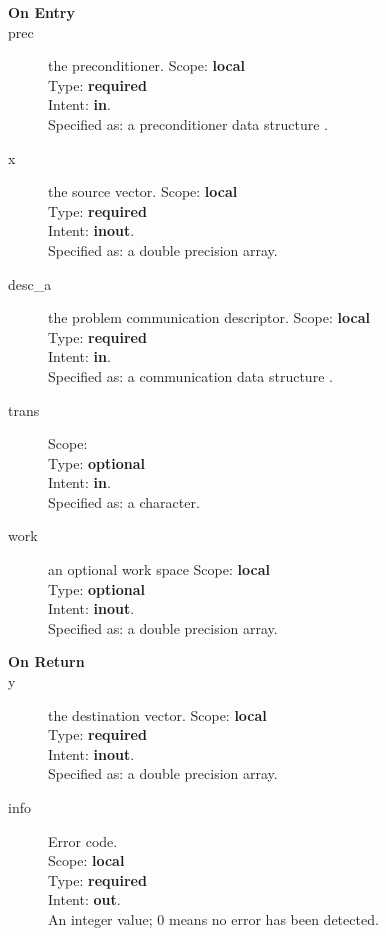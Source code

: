 

\begin{description}
\item[\bf On Entry]
\item[prec] the preconditioner.
Scope: {\bf local} \\
Type: {\bf required}\\
Intent: {\bf in}.\\
Specified as: a preconditioner data structure \precdata.
\item[x] the source vector.
Scope: {\bf local} \\
Type: {\bf required}\\
Intent: {\bf inout}.\\
Specified as: a double precision array.
\item[desc\_a] the problem communication descriptor.
Scope: {\bf local} \\
Type: {\bf required}\\
Intent: {\bf in}.\\
Specified as: a communication data structure \descdata.
\item[trans] 
Scope: {\bf } \\
Type: {\bf optional}\\
Intent: {\bf in}.\\
Specified as: a character.
\item[work] an optional work space
Scope: {\bf local} \\
Type: {\bf optional}\\
Intent: {\bf inout}.\\
Specified as: a double precision array.
\end{description}

\begin{description}
\item[\bf On Return]
\item[y] the destination vector.
Scope: {\bf local} \\
Type: {\bf required}\\
Intent: {\bf inout}.\\
Specified as: a double precision array.
\item[info] Error code.\\
Scope: {\bf local} \\
Type: {\bf required} \\
Intent: {\bf out}.\\
An integer value; 0 means no error has been detected. 
\end{description}



